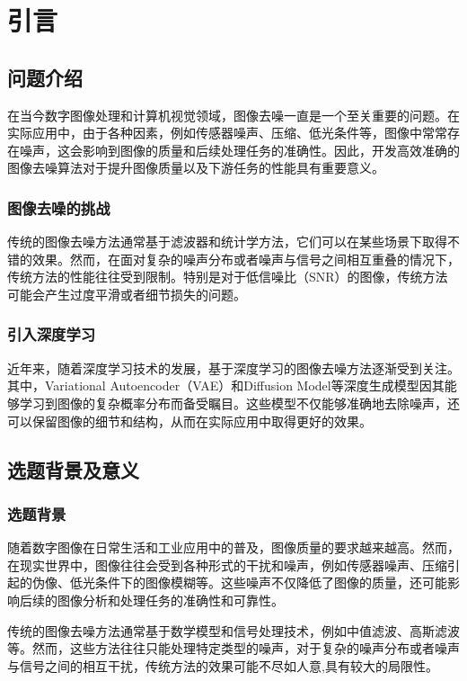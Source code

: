 \chapter{引言}
\section{问题介绍}

在当今数字图像处理和计算机视觉领域，图像去噪一直是一个至关重要的问题。在实际应用中，由于各种因素，例如传感器噪声、压缩、低光条件等，图像中常常存在噪声，这会影响到图像的质量和后续处理任务的准确性。因此，开发高效准确的图像去噪算法对于提升图像质量以及下游任务的性能具有重要意义。
\subsection*{图像去噪的挑战}
传统的图像去噪方法通常基于滤波器和统计学方法，它们可以在某些场景下取得不错的效果。然而，在面对复杂的噪声分布或者噪声与信号之间相互重叠的情况下，传统方法的性能往往受到限制。特别是对于低信噪比（SNR）的图像，传统方法可能会产生过度平滑或者细节损失的问题。
\subsection*{引入深度学习}
近年来，随着深度学习技术的发展，基于深度学习的图像去噪方法逐渐受到关注。其中，Variational Autoencoder（VAE）和Diffusion Model等深度生成模型因其能够学习到图像的复杂概率分布而备受瞩目。这些模型不仅能够准确地去除噪声，还可以保留图像的细节和结构，从而在实际应用中取得更好的效果。
\section{选题背景及意义}

\subsection*{选题背景}
随着数字图像在日常生活和工业应用中的普及，图像质量的要求越来越高。然而，在现实世界中，图像往往会受到各种形式的干扰和噪声，例如传感器噪声、压缩引起的伪像、低光条件下的图像模糊等。这些噪声不仅降低了图像的质量，还可能影响后续的图像分析和处理任务的准确性和可靠性。\par 
传统的图像去噪方法通常基于数学模型和信号处理技术，例如中值滤波、高斯滤波等。然而，这些方法往往只能处理特定类型的噪声，对于复杂的噪声分布或者噪声与信号之间的相互干扰，传统方法的效果可能不尽如人意,具有较大的局限性。
